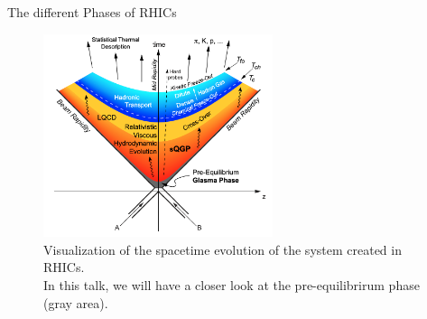 \begin{frame}{The different Phases of RHICs}
\begin{figure}[H]
\centering
\includegraphics[width = 0.6\textwidth]{figures/rhic_schematic}
\caption{Visualization of the spacetime evolution of the system created in RHICs.\footnotemark \\ In this talk, we will have a closer look at the \alert{pre-equilibrirum} phase (gray area).}	
\end{figure}
\end{frame}




